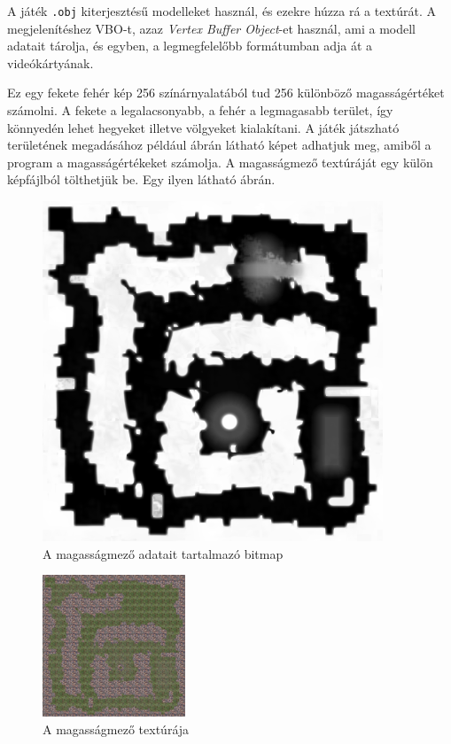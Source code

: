 A játék \texttt{.obj} kiterjesztésű modelleket használ, és ezekre húzza rá a textúrát. A megjelenítéshez VBO-t, azaz \textit{Vertex Buffer Object}-et használ, ami a modell adatait tárolja, és egyben, a legmegfelelőbb formátumban adja át a videókártyának.

Ez egy fekete fehér kép 256 színárnyalatából tud 256 különböző magasságértéket számolni. A fekete a legalacsonyabb, a fehér a legmagasabb terület, így könnyedén lehet hegyeket illetve völgyeket kialakítani. A játék játszható területének megadásához például  ábrán látható képet adhatjuk meg, amiből a program a magasságértékeket számolja. A magasságmező textúráját egy külön képfájlból tölthetjük be. Egy ilyen látható  ábrán.

\begin{figure}[h]
\centering
\includegraphics[scale=0.5]{kepek/heightmap.png}
\caption{A magasságmező adatait tartalmazó bitmap}
\label{fig:heightmap}
\end{figure}

\begin{figure}[h]
\centering
\includegraphics[scale=1.5]{kepek/heightmap_texture.png}
\caption{A magasságmező textúrája}
\label{fig:heightmap_texture}
\end{figure}

